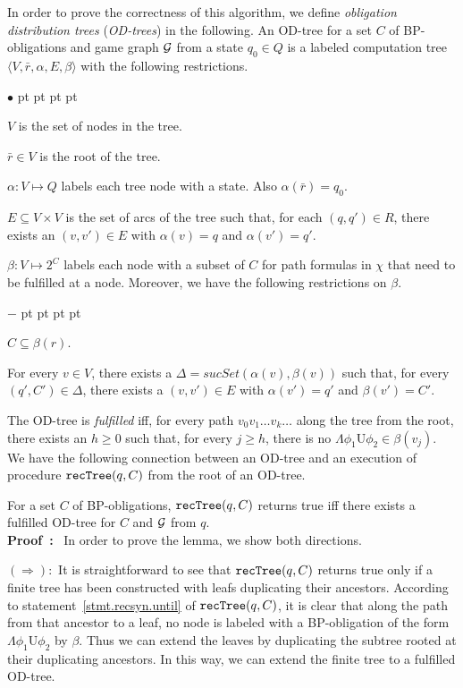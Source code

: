 \documentclass[11pt]{article}
\newcommand{\ttsynsuc}{\textit{sucSet}}
\newcommand{\ttrecsyn}{\mbox{\tt recTree}}
\newcommand{\calg}{{\cal G}}
\newcommand{\pf}{\noindent\mbox{\bf Proof : }}
\newcommand{\until}{\textrm{U}} %
\newenvironment{list1}{\begin{list}{$\bullet$}
{\topsep 0 pt \parsep 0 pt \partopsep 0 pt \itemsep 0 pt}}{\end{list}}
\newenvironment{list2}{\begin{list}{$-$}
{\topsep 0 pt \parsep 0 pt \partopsep 0 pt \itemsep 0 pt}}{\end{list}}
\begin{document}
In order to prove the correctness of this algorithm,
we define {\em obligation distribution trees} ({\em OD-trees})
in the following.
An OD-tree for a set $C$ of BP-obligations and
game graph $\calg$
from a state $q_0\in Q$ is a labeled computation tree
$\langle V,\bar{r},\alpha,E,\beta\rangle$ with
the following restrictions.
\begin{list1}
\item $V$ is the set of nodes in the tree.
\item $\bar{r}\in V$ is the root of the tree.
\item $\alpha:V\mapsto Q$ labels each tree node with a state.
    Also $\alpha(\bar{r})=q_0$.
\item $E\subseteq V\times V$ is the set of arcs of the tree
    such that, for each $(q,q')\in R$,
    there exists an $(v,v')\in E$ with $\alpha(v)=q$ and $\alpha(v')=q'$.
\item $\beta:V\mapsto 2^C$ labels
    each node with a subset of $C$ for path formulas in $\chi$
    that need to be fulfilled at a node.  
    Moreover, we have the following restrictions on $\beta$.
    \begin{list2}
    \item $C\subseteq \beta(r)$.
    \item For every $v\in V$,
        there exists a 
        $\Delta=\ttsynsuc(\alpha(v),\beta(v))$
        such that,
        for every $(q',C')\in \Delta$,
        there exists a $(v,v')\in E$ with
        $\alpha(v')=q'$ and $\beta(v')=C'$.
    \end{list2}
\end{list1}
The OD-tree is {\em fulfilled} iff, for every
path $v_0v_1\ldots v_k\ldots$ along the tree from the root,
there exists an $h\geq 0$ such that,
for every $j\geq h$, there is no $\Lambda\phi_1\until\phi_2\in \beta(v_j)$.  
We have the following connection between an OD-tree and an
execution of procedure
\mbox{$\ttrecsyn(q,C)$}
from the root of an OD-tree.

{\lemma \label{lemma.rectree.sitree}
For a set $C$ of BP-obligations, 
$\ttrecsyn(q,C)$ returns true iff
there exists a fulfilled OD-tree for $C$ and $\calg$ from $q$.
}\\\pf 
In order to prove the lemma, we show both directions.

\noindent $(\Rightarrow):$
It is straightforward to see that $\ttrecsyn(q,C)$
returns true only if a finite tree has been constructed
with leafs duplicating their ancestors.
According to statement~\ref{stmt.recsyn.until} of $\ttrecsyn(q,C)$,
it is clear that along the path from that ancestor to a leaf, no
node is labeled with a BP-obligation of the form $\Lambda\phi_1\until\phi_2$ 
by $\beta$.
Thus we can extend the leaves by duplicating the subtree rooted
at their duplicating ancestors.
In this way, we can extend the finite tree to a fulfilled OD-tree.
\end{document}
